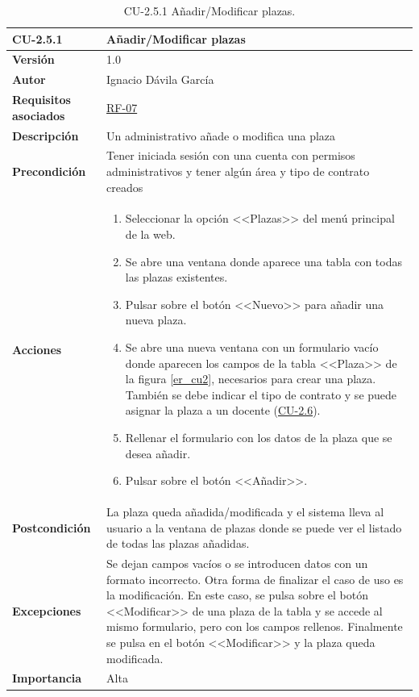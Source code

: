 \begin{table}[p]
	\label{table:CU-2.5.1}
	\centering
	\begin{tabularx}{\linewidth}{ p{} p{} }
		\toprule
		\textbf{CU-2.5.1}    & \textbf{Añadir/Modificar plazas}\\
		\toprule
		\textbf{Versión}              & 1.0    \\
		\textbf{Autor}                & Ignacio Dávila García \\
		\textbf{Requisitos asociados} & \hyperref[itm:RF7]{RF-07} \\
		\textbf{Descripción}          & Un administrativo añade o modifica una plaza \\
		\textbf{Precondición}         & Tener iniciada sesión con una cuenta con permisos administrativos y tener algún área y tipo de contrato creados \\
		\textbf{Acciones}             &
		\begin{enumerate}
			\def\labelenumi{\arabic{enumi}.}
			\tightlist
			\item Seleccionar la opción <<Plazas>> del menú principal de la web.
			\item Se abre una ventana donde aparece una tabla con todas las plazas existentes.
			\item Pulsar sobre el botón <<Nuevo>> para añadir una nueva plaza.
			\item Se abre una nueva ventana con un formulario vacío donde aparecen los campos de la tabla <<Plaza>> de la figura \ref{er_cu2}, necesarios para crear una plaza. También se debe indicar el tipo de contrato y se puede asignar la plaza a un docente (\hyperref[table:CU-2.6]{CU-2.6}).
			\item Rellenar el formulario con los datos de la plaza que se desea añadir.
			\item Pulsar sobre el botón <<Añadir>>.
		\end{enumerate}\\
		\textbf{Postcondición}        & La plaza queda añadida/modificada y el sistema lleva al usuario a la ventana de plazas donde se puede ver el listado de todas las plazas añadidas. \\
		\textbf{Excepciones}          & Se dejan campos vacíos o se introducen datos con un formato incorrecto. Otra forma de finalizar el caso de uso es la modificación. En este caso, se pulsa sobre el botón <<Modificar>> de una plaza de la tabla y se accede al mismo formulario, pero con los campos rellenos. Finalmente se pulsa en el botón <<Modificar>> y la plaza queda modificada. \\
		\textbf{Importancia}          & Alta \\
		\bottomrule
	\end{tabularx}
	\caption{CU-2.5.1 Añadir/Modificar plazas.}
\end{table}
\FloatBarrier

